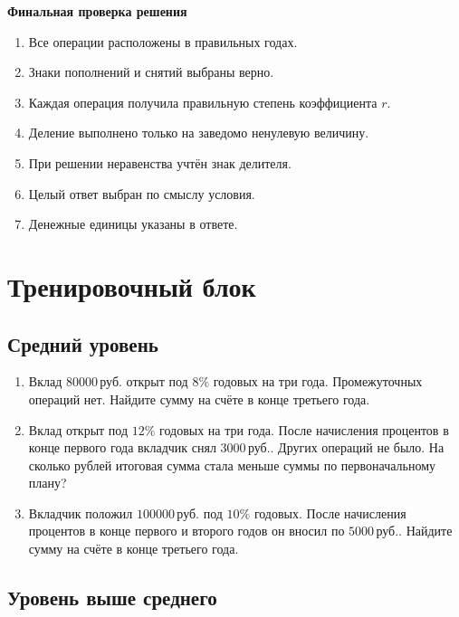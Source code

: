\documentclass[a4paper,12pt]{article}
\newcommand{\key}[1]{\textcolor{darkaccent}{\textbf{#1}}}
\newcommand{\rub}{\,\text{руб.}}
\begin{document}
\key{Финальная проверка решения}

\begin{enumerate}
  \item Все операции расположены в правильных годах.
  \item Знаки пополнений и снятий выбраны верно.
  \item Каждая операция получила правильную степень коэффициента \(r\).
  \item Деление выполнено только на заведомо ненулевую величину.
  \item При решении неравенства учтён знак делителя.
  \item Целый ответ выбран по смыслу условия.
  \item Денежные единицы указаны в ответе.
\end{enumerate}

\newpage

\section*{Тренировочный блок}

\subsection*{Средний уровень}

\begin{enumerate}
  \item Вклад \(80000\rub\) открыт под \(8\%\) годовых на три года.
  Промежуточных операций нет. Найдите сумму на счёте в конце третьего
  года.

  \item Вклад открыт под \(12\%\) годовых на три года. После начисления
  процентов в конце первого года вкладчик снял \(3000\rub\).
  Других операций не было. На сколько рублей итоговая сумма стала
  меньше суммы по первоначальному плану?

  \item Вкладчик положил \(100000\rub\) под \(10\%\) годовых.
  После начисления процентов в конце первого и второго годов он вносил
  по \(5000\rub\). Найдите сумму на счёте в конце третьего года.
\end{enumerate}

\subsection*{Уровень выше среднего}
\end{document}

